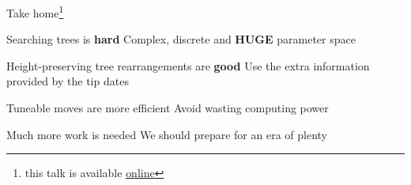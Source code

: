 \documentclass[newPxFont,numfooter,sectionpages]{beamer}
\begin{document}
\begin{frame}{Take home\footnote{\tiny this talk is available \href{https://github.com/maxbiostat/third_year_talk}{online}}}
\begin{alertblock}{Searching trees is \textbf{hard}}
Complex, discrete and \textbf{HUGE} parameter space
\end{alertblock}\pause
\begin{exampleblock}{Height-preserving tree rearrangements are \textbf{good}}
Use the extra information provided by the tip dates
\end{exampleblock}\pause
\begin{block}{Tuneable moves are more efficient}
 Avoid wasting computing power
\end{block}\pause
\begingroup
{}
\begin{block}{Much more work is needed}
We should prepare for an era of plenty
\end{block}
\endgroup
\end{frame}

\begingroup
{}
\begin{frame}[plain]


\end{frame}
\endgroup
\end{document}
